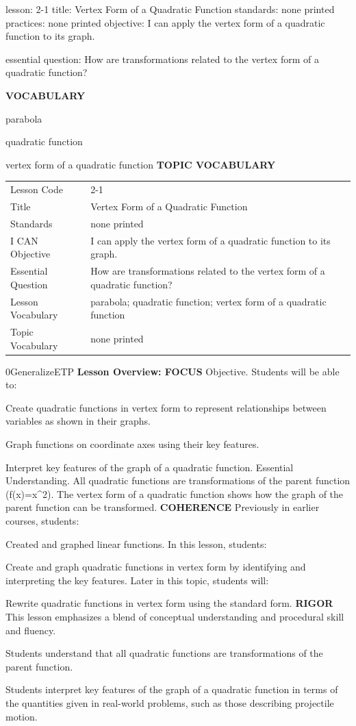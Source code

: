 \documentclass{article}
\newenvironment{lesson-meta}{}{}        %
\newenvironment{te-addendum}[2]{}{}     %
\newcommand{\te}[1]{}                   %
\begin{document}
\begin{lesson-meta}
lesson: 2-1
title: Vertex Form of a Quadratic Function
standards: none printed
practices: none printed
objective: I can apply the vertex form of a quadratic function to its graph.

essential question: How are transformations related to the vertex form of a quadratic function?

\textbf{VOCABULARY}
\item parabola
\item quadratic function
\item vertex form of a quadratic function
\textbf{TOPIC VOCABULARY}
\te{No topic vocabulary list is printed on these lesson pages.}
\begin{tabular}{ll}
Lesson Code & 2-1 \\
Title & Vertex Form of a Quadratic Function \\
Standards & none printed \\
I CAN Objective & I can apply the vertex form of a quadratic function to its graph. \\
Essential Question & How are transformations related to the vertex form of a quadratic function? \\
Lesson Vocabulary & parabola; quadratic function; vertex form of a quadratic function \\
Topic Vocabulary & none printed \\
\end{tabular}
\end{lesson-meta}
\begin{te-addendum}{0}{GeneralizeETP}
\textbf{Lesson Overview: FOCUS}
Objective. Students will be able to:
\item Create quadratic functions in vertex form to represent relationships between variables as shown in their graphs.
\item Graph functions on coordinate axes using their key features.
\item Interpret key features of the graph of a quadratic function.
Essential Understanding. All quadratic functions are transformations of the parent function (f(x)=x^2). The vertex form of a quadratic function shows how the graph of the parent function can be transformed.
\textbf{COHERENCE}
Previously in earlier courses, students:
\item Created and graphed linear functions.
In this lesson, students:
\item Create and graph quadratic functions in vertex form by identifying and interpreting the key features.
Later in this topic, students will:
\item Rewrite quadratic functions in vertex form using the standard form.
\textbf{RIGOR}
This lesson emphasizes a blend of conceptual understanding and procedural skill and fluency.
\item Students understand that all quadratic functions are transformations of the parent function.
\item Students interpret key features of the graph of a quadratic function in terms of the quantities given in real-world problems, such as those describing projectile motion.
\end{te-addendum}
\end{document}
